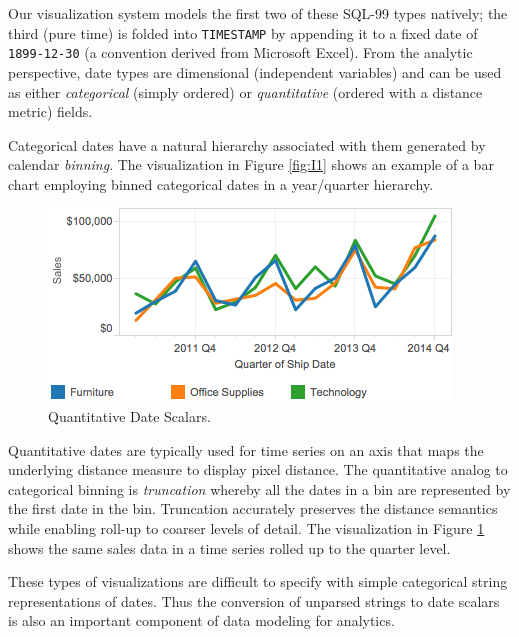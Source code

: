 Our visualization system models the first two of these SQL-99 types natively; the third (pure time) is folded into \texttt{TIMESTAMP} by appending it to a fixed date of \texttt{1899-12-30} (a convention derived from Microsoft Excel). From the analytic perspective, date types are dimensional (\ie independent variables) and can be used as either \textit{categorical} (simply ordered) or \textit{quantitative} (ordered with a distance metric) fields.

Categorical dates have a natural hierarchy associated with them generated by calendar \textit{binning}. The visualization in Figure \ref{fig:I1} shows an example of a bar chart employing binned categorical dates in a year/quarter hierarchy.

\begin{figure}[ht]
\centering
\includegraphics[width=\columnwidth]{figures/FigureI2}
\caption{Quantitative Date Scalars.}
\label{fig:I2}
\end{figure}



Quantitative dates are typically used for time series on an axis that maps the underlying distance measure to display pixel distance. The quantitative analog to categorical binning is \textit{truncation} whereby all the dates in a bin are represented by the first date in the bin. Truncation accurately preserves the distance semantics while enabling roll-up to coarser levels of detail. The visualization in Figure \ref{fig:I2} shows the same sales data in a time series rolled up to the quarter level.

These types of visualizations are difficult to specify with simple categorical string representations of dates. Thus the conversion of unparsed strings to date scalars is also an important component of data modeling for analytics.


